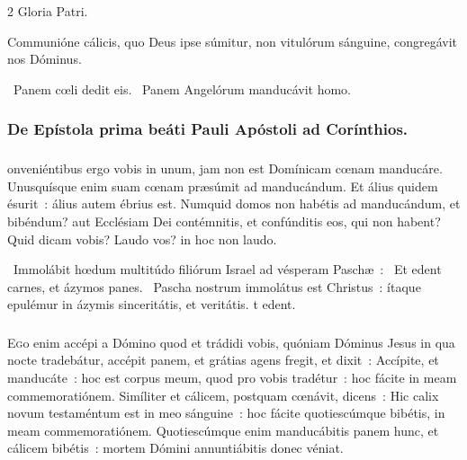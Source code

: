 \documentclass[9pt,twoside]{extarticle}
\begin{document}
\begin{multicols}{2}
Gloria Patri.

\begin{tightlist}{}
\item {} Communióne cálicis, quo Deus ipse súmitur, non vitulórum sánguine, congregávit nos Dóminus.
\item {}~Panem cœli dedit eis. ~Panem Angelórum manducávit homo.
\item {}
\end{tightlist}

\subsubsection*{\center De Epístola prima beáti Pauli Apóstoli ad Corínthios.}
\subsubsection*{\center {}}
onveniéntibus ergo vobis in unum, jam non est Domínicam cœnam manducáre. Unusquísque enim suam cœnam præsúmit ad manducándum. Et álius quidem ésurit~: álius autem ébrius est. Numquid domos non habétis ad manducándum, et bibéndum? aut Ecclésiam Dei contémnitis, et confúnditis eos, qui non habent? Quid dicam vobis? Laudo vos? in hoc non laudo.

\begin{tightlist}{}
\item {}~Immolábit hœdum multitúdo filiórum Israel ad vésperam Paschæ~: \textred{*}~Et edent carnes, et ázymos panes. ~Pascha nostrum immolátus est Christus~: ítaque epulémur in ázymis sinceritátis, et veritátis. t edent.
\end{tightlist}

\subsubsection*{\center{}}
\lettrine{E}go enim accépi a Dómino quod et trádidi vobis, quóniam Dóminus Jesus in qua nocte tradebátur, accépit panem, et grátias agens fregit, et dixit~: Accípite, et manducáte~: hoc est corpus meum, quod pro vobis tradétur~: hoc fácite in meam commemoratiónem. Simíliter et cálicem, postquam cœnávit, dicens~: Hic calix novum testaméntum est in meo sánguine~: hoc fácite quotiescúmque bibétis, in meam commemoratiónem. Quotiescúmque enim manducábitis panem hunc, et cálicem bibétis~: mortem Dómini annuntiábitis donec véniat.


\end{multicols}
\end{document}
